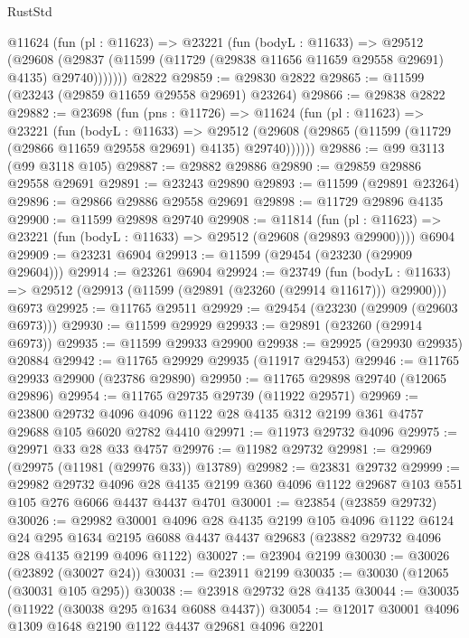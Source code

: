 \begin{lexlean}{RustStd}
\begin{coremodule}
      @11624
        (fun (pl : @11623) =>
        @23221
          (fun (bodyL : @11633) =>
          @29512
            (@29608
              (@29837 (@11599 (@11729 (@29838 @11656 @11659 @29558 @29691) @4135) @29740)))))))
    @2822
@29859 := @29830 @2822
@29865 := @11599 (@23243 (@29859 @11659 @29558 @29691) @23264)
@29866 := @29838 @2822
@29882 := @23698
    (fun (pns : @11726) =>
    @11624
      (fun (pl : @11623) =>
      @23221
        (fun (bodyL : @11633) =>
        @29512 (@29608 (@29865 (@11599 (@11729 (@29866 @11659 @29558 @29691) @4135) @29740))))))
@29886 := @99 @3113 (@99 @3118 @105)
@29887 := @29882 @29886
@29890 := @29859 @29886 @29558 @29691
@29891 := @23243 @29890
@29893 := @11599 (@29891 @23264)
@29896 := @29866 @29886 @29558 @29691
@29898 := @11729 @29896 @4135
@29900 := @11599 @29898 @29740
@29908 := @11814
    (fun (pl : @11623) => @23221 (fun (bodyL : @11633) => @29512 (@29608 (@29893 @29900))))
    @6904
@29909 := @23231 @6904
@29913 := @11599 (@29454 (@23230 (@29909 @29604)))
@29914 := @23261 @6904
@29924 := @23749
    (fun (bodyL : @11633) => @29512 (@29913 (@11599 (@29891 (@23260 (@29914 @11617))) @29900)))
    @6973
@29925 := @11765 @29511
@29929 := @29454 (@23230 (@29909 (@29603 @6973)))
@29930 := @11599 @29929
@29933 := @29891 (@23260 (@29914 @6973))
@29935 := @11599 @29933 @29900
@29938 := @29925 (@29930 @29935) @20884
@29942 := @11765 @29929 @29935 (@11917 @29453)
@29946 := @11765 @29933 @29900 (@23786 @29890)
@29950 := @11765 @29898 @29740 (@12065 @29896)
@29954 := @11765 @29735 @29739 (@11922 @29571)
@29969 := @23800
    @29732
    @4096
    @4096
    @1122
    @28
    @4135
    @312
    @2199
    @361
    @4757
    @29688
    @105
    @6020
    @2782
    @4410
@29971 := @11973 @29732 @4096
@29975 := @29971 @33 @28 @33 @4757
@29976 := @11982 @29732
@29981 := @29969 (@29975 (@11981 (@29976 @33)) @13789)
@29982 := @23831 @29732
@29999 := @29982
    @29732
    @4096
    @28
    @4135
    @2199
    @360
    @4096
    @1122
    @29687
    @103
    @551
    @105
    @276
    @6066
    @4437
    @4437
    @4701
@30001 := @23854 (@23859 @29732)
@30026 := @29982
    @30001
    @4096
    @28
    @4135
    @2199
    @105
    @4096
    @1122
    @6124
    @24
    @295
    @1634
    @2195
    @6088
    @4437
    @4437
    @29683
    (@23882 @29732 @4096 @28 @4135 @2199 @4096 @1122)
@30027 := @23904 @2199
@30030 := @30026 (@23892 (@30027 @24))
@30031 := @23911 @2199
@30035 := @30030 (@12065 (@30031 @105 @295))
@30038 := @23918 @29732 @28 @4135
@30044 := @30035 (@11922 (@30038 @295 @1634 @6088 @4437))
@30054 := @12017 @30001 @4096 @1309 @1648 @2190 @1122 @4437 @29681 @4096 @2201

\end{coremodule}
\end{lexlean}
